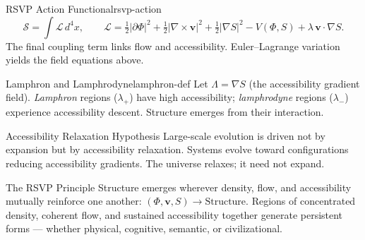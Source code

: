 \begin{definition}{RSVP Action Functional}{rsvp-action}
  \[
    \mathcal{S} = \int \mathcal{L}\,d^4x, \qquad
    \mathcal{L} = \tfrac{1}{2}|\partial\Phi|^2 + \tfrac{1}{2}|\nabla\times\mathbf{v}|^2
    + \tfrac{1}{2}|\nabla S|^2 - V(\Phi,S) + \lambda\,\mathbf{v}\cdot\nabla S.
  \]
  The final coupling term links flow and accessibility. Euler–Lagrange
  variation yields the field equations above.
\end{definition}

\begin{definition}{Lamphron and Lamphrodyne}{lamphron-def}
  Let $\Lambda = \nabla S$ (the accessibility gradient field).
  \emph{Lamphron} regions ($\lambda_+$) have high accessibility;
  \emph{lamphrodyne} regions ($\lambda_-$) experience accessibility descent.
  Structure emerges from their interaction.
\end{definition}

\begin{namedthm}{Accessibility Relaxation Hypothesis}
  Large-scale evolution is driven not by expansion but by accessibility
  relaxation. Systems evolve toward configurations reducing accessibility
  gradients. The universe relaxes; it need not expand.
\end{namedthm}

\begin{namedthm}{The RSVP Principle}
  Structure emerges wherever density, flow, and accessibility mutually
  reinforce one another:
  $(\Phi, \mathbf{v}, S) \longrightarrow \text{Structure}$.
  Regions of concentrated density, coherent flow, and sustained
  accessibility together generate persistent forms — whether physical,
  cognitive, semantic, or civilizational.
\end{namedthm}

